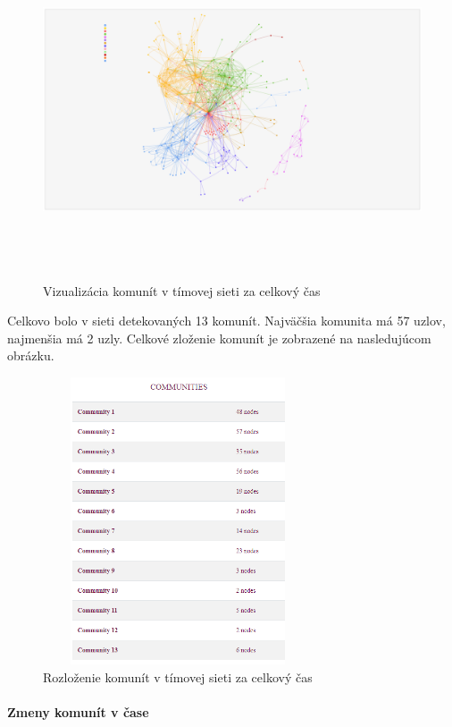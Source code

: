 \documentclass[slovak,master,public,dept460,male,cpdeclaration,oneside]{diploma}
\begin{document}
\begin{figure}[H]
\centering
\includegraphics[width=17cm, height=10cm]{figures/team_communities_celkovo}
\caption{Vizualizácia komunít v tímovej sieti za celkový čas}
\end{figure}

Celkovo bolo v sieti detekovaných 13 komunít. Najväčšia komunita má 57 uzlov, najmenšia má 2 uzly. Celkové zloženie komunít je zobrazené na nasledujúcom obrázku.

\begin{figure}[H]
\centering
\includegraphics[width=8cm, height=8.5cm]{figures/team_communities_tab_celkovo}
\caption{Rozloženie komunít v tímovej sieti za celkový čas}
\end{figure}

\paragraph{Zmeny komunít v čase}
\hfill \break
\end{document}
